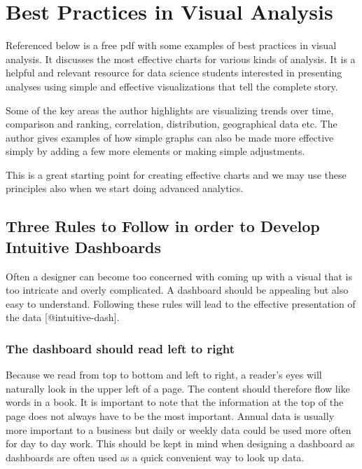 \documentclass[]{book}
\theoremstyle{definition}
\theoremstyle{definition}
\theoremstyle{definition}
\theoremstyle{remark}
\begin{document}
\section{Best Practices in Visual
Analysis}\label{best-practices-in-visual-analysis}

Referenced below is a free pdf with some examples of best practices in
visual analysis. It discusses the most effective charts for various
kinds of analysis. It is a helpful and relevant resource for data
science students interested in presenting analyses using simple and
effective visualizations that tell the complete story.

Some of the key areas the author highlights are visualizing trends over
time, comparison and ranking, correlation, distribution, geographical
data etc. The author gives examples of how simple graphs can also be
made more effective simply by adding a few more elements or making
simple adjustments.

This is a great starting point for creating effective charts and we may
use these principles also when we start doing advanced analytics.

\subsection{Three Rules to Follow in order to Develop Intuitive
Dashboards}\label{three-rules-to-follow-in-order-to-develop-intuitive-dashboards-1}

Often a designer can become too concerned with coming up with a visual
that is too intricate and overly complicated. A dashboard should be
appealing but also easy to understand. Following these rules will lead
to the effective presentation of the data {[}@intuitive-dash{]}.

\subsubsection{The dashboard should read left to
right}\label{the-dashboard-should-read-left-to-right-1}

Because we read from top to bottom and left to right, a reader's eyes
will naturally look in the upper left of a page. The content should
therefore flow like words in a book. It is important to note that the
information at the top of the page does not always have to be the most
important. Annual data is usually more important to a business but daily
or weekly data could be used more often for day to day work. This should
be kept in mind when designing a dashboard as dashboards are often used
as a quick convenient way to look up data.
\end{document}
